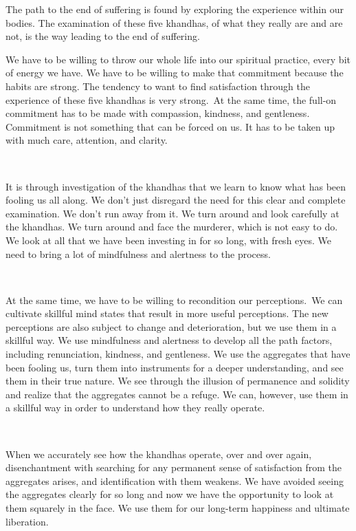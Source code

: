 The path to the end of suffering is found by exploring the experience within our bodies. The examination of these five khandhas, of what they really are and are not, is the way leading to the end of suffering.

We have to be willing to throw our whole life into our spiritual practice, every bit of energy we have. We have to be willing to make that commitment because the habits are strong. The tendency to want to find satisfaction through the experience of these five khandhas is very strong.~At the same time, the full-on commitment has to be made with compassion, kindness, and gentleness. Commitment is not something that can be forced on us. It has to be taken up with much care, attention, and clarity.~

~

It is through investigation of the khandhas that we learn to know what has been fooling us all along. We don't just disregard the need for this clear and complete examination. We don't run away from it. We turn around and look carefully at the khandhas. We turn around and face the murderer, which is not easy to do. We look at all that we have been investing in for so long, with fresh eyes. We need to bring a lot of mindfulness and alertness to the process.~

~

At the same time, we have to be willing to recondition our perceptions.~We can cultivate skillful mind states that result in more useful perceptions. The new perceptions are also subject to change and deterioration, but we use them in a skillful way. We use mindfulness and alertness to develop all the path factors, including renunciation, kindness, and gentleness. We use the aggregates that have been fooling us, turn them into instruments for a deeper understanding, and see them in their true nature. We see through the illusion of permanence and solidity and realize that the aggregates cannot be a refuge. We can, however, use them in a skillful way in order to understand how they really operate.~

~

When we accurately see how the khandhas operate, over and over again, disenchantment with searching for any permanent sense of satisfaction from the aggregates arises, and identification with them weakens. We have avoided seeing the aggregates clearly for so long and now we have the opportunity to look at them squarely in the face. We use them for our long-term happiness and ultimate liberation.~

